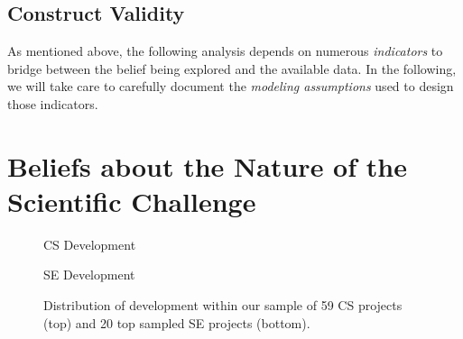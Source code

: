 \documentclass[sigconf,review,anonymous]{acmart}
\begin{document}
\subsection{Construct Validity}
As mentioned above, the following analysis depends on numerous {\em indicators} to bridge between the belief being explored and the available data. 
In the following,  we will take care to carefully document
the {\em modeling assumptions} used to design those indicators.

\section{Beliefs about the Nature of the Scientific Challenge}


\begin{figure}[!b]
\hspace{-3mm}
\begin{center}
\begin{minipage}{.5\textwidth}
        \centering \hspace{-3mm}
       CS Development
\end{minipage}%
\begin{minipage}{0.5\textwidth}
        \centering
    SE Development
\end{minipage}

\end{center}
\caption{Distribution of development within our sample of 59 CS projects (top) and 20 top sampled SE projects (bottom).}
\label{fig:SE_activities}
\end{figure}
\end{document}
